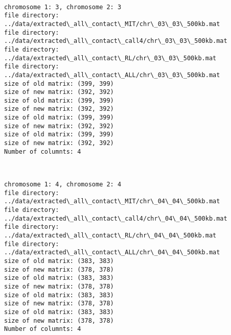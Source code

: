 \documentclass[11pt]{article}
\begin{document}
    \begin{center}
    \end{center}
    { \hspace*{\fill} \\}
    
    \begin{Verbatim}[commandchars=\\\{\}]
chromosome 1: 3, chromosome 2: 3
file directory: ../data/extracted\_all\_contact\_MIT/chr\_03\_03\_500kb.mat
file directory: ../data/extracted\_all\_contact\_call4/chr\_03\_03\_500kb.mat
file directory: ../data/extracted\_all\_contact\_RL/chr\_03\_03\_500kb.mat
file directory: ../data/extracted\_all\_contact\_ALL/chr\_03\_03\_500kb.mat
size of old matrix: (399, 399)
size of new matrix: (392, 392)
size of old matrix: (399, 399)
size of new matrix: (392, 392)
size of old matrix: (399, 399)
size of new matrix: (392, 392)
size of old matrix: (399, 399)
size of new matrix: (392, 392)
Number of columnts: 4

    \end{Verbatim}

    \begin{center}
    \end{center}
    { \hspace*{\fill} \\}
    
    \begin{Verbatim}[commandchars=\\\{\}]
chromosome 1: 4, chromosome 2: 4
file directory: ../data/extracted\_all\_contact\_MIT/chr\_04\_04\_500kb.mat
file directory: ../data/extracted\_all\_contact\_call4/chr\_04\_04\_500kb.mat
file directory: ../data/extracted\_all\_contact\_RL/chr\_04\_04\_500kb.mat
file directory: ../data/extracted\_all\_contact\_ALL/chr\_04\_04\_500kb.mat
size of old matrix: (383, 383)
size of new matrix: (378, 378)
size of old matrix: (383, 383)
size of new matrix: (378, 378)
size of old matrix: (383, 383)
size of new matrix: (378, 378)
size of old matrix: (383, 383)
size of new matrix: (378, 378)
Number of columnts: 4

    \end{Verbatim}

    \begin{center}
    \end{center}
    { \hspace*{\fill} \\}
    
\end{document}

